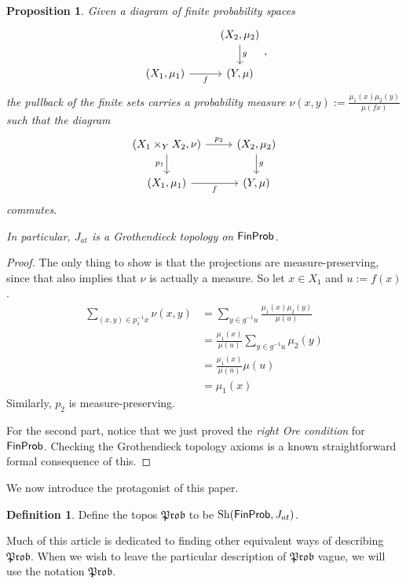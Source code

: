 \documentclass[a4paper]{amsproc}
\theoremstyle{plain}
\newtheorem{proposition}[theorem]{Proposition}
\theoremstyle{definition}
\newtheorem{definition}[theorem]{Definition}
\theoremstyle{remark}
\numberwithin{equation}{section}
\DeclareMathOperator{\Sh}{Sh}
\newcommand{\FinProb}{\textup{\textsf{FinProb}}}
\newcommand{\Prob}{\mathfrak{Prob}}
\begin{document}
\begin{proposition} \label{pullback_measure}
    Given a diagram of finite probability spaces
    \[
    \begin{tikzcd}
                                & {(X_2,\mu_2)} \arrow[d, "g"] \\
    {(X_1, \mu_1)} \arrow[r, "f"'] & {(Y,\mu)}
    \end{tikzcd},
    \]
    the pullback of the finite sets carries a probability measure $\nu(x,y) := \frac{\mu_1(x) \mu_2(y)}{\mu(f x)}$ such that the diagram
    \[
    \begin{tikzcd}
    {(X_1 \times_Y X_2, \nu)} \arrow[d, "p_1"'] \arrow[r, "p_2"] & {(X_2,\mu_2)} \arrow[d, "g"] \\
    {(X_1, \mu_1)} \arrow[r, "f"']                               & {(Y,\mu)}
    \end{tikzcd}
    \]
    commutes.

    In particular, $J_{at}$ is a Grothendieck topology on $\FinProb$.
\end{proposition}
\begin{proof}
    The only thing to show is that the projections are measure-preserving, since that also implies that $\nu$ is actually a measure. So let $x \in X_1$ and $u := f(x)$.
    \begin{align*}
        \sum_{(x,y) \in p_1^{-1} x} \nu(x,y) &= \sum_{y \in g^{-1} u} \frac{\mu_1(x)\mu_2(y)}{\mu(u)} \\
        &= \frac{\mu_1(x)}{\mu(u)} \sum_{y \in g^{-1} u} \mu_2(y) \\
        &= \frac{\mu_1(x)}{\mu(u)} \mu(u) \\
        &= \mu_1(x)
    \end{align*}
    Similarly, $p_2$ is measure-preserving.

    For the second part, notice that we just proved the \emph{right Ore condition} for $\FinProb$. Checking the Grothendieck topology axioms is a known straightforward formal consequence of this.
\end{proof}

We now introduce the protagonist of this paper.

\begin{definition}
    Define the topos $\Prob$ to be $\Sh(\FinProb, J_{at})$.
\end{definition}

Much of this article is dedicated to finding other equivalent ways of describing $\Prob$. When we wish to leave the particular description of $\Prob$ vague, we will use the notation $\Prob$.
\end{document}
